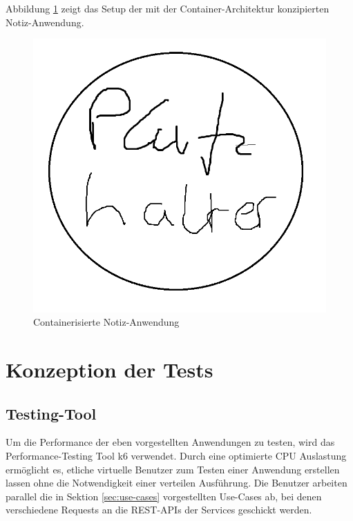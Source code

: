 Abbildung \ref{fig:notes-container} zeigt das Setup der mit der Container-Architektur konzipierten Notiz-Anwendung.

\begin{figure}[H]
    \includegraphics[width=\textwidth]{img/platzhalter.png}
    \caption[Containerisierte Notiz-Anwendung]{Containerisierte Notiz-Anwendung}
    \label{fig:notes-container}
\end{figure}

\section{Konzeption der Tests}

\subsection{Testing-Tool}
Um die Performance der eben vorgestellten Anwendungen zu testen, wird das Performance-Testing Tool k6 \cite{noauthor_load_nodate} verwendet. Durch eine optimierte CPU Auslastung ermöglicht es, etliche virtuelle Benutzer zum Testen einer Anwendung erstellen lassen ohne die Notwendigkeit einer verteilen Ausführung\cite{noauthor_running_nodate}. Die Benutzer arbeiten parallel die in Sektion \ref{sec:use-cases} vorgestellten Use-Cases ab, bei denen verschiedene Requests an die REST-APIs der Services geschickt werden. 

